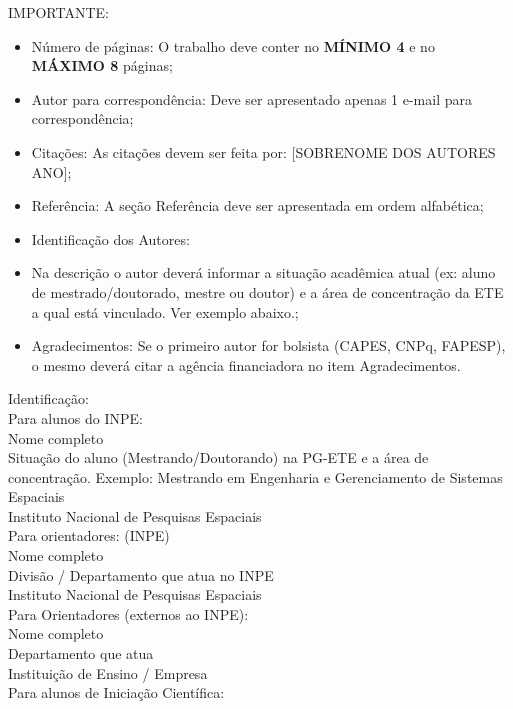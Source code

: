 \documentclass[12pt]{article}
\begin{document}



\textcolor[rgb]{1,0,0}{
	IMPORTANTE:
	\begin{itemize}
		\item Número de páginas: O trabalho deve conter no \textbf{MÍNIMO 4} e no \textbf{MÁXIMO 8} páginas;
		\item Autor para correspondência: Deve ser apresentado apenas 1 e-mail para correspondência;
		\item Citações: As citações devem ser feita por: [SOBRENOME DOS AUTORES ANO];
		\item Referência: A seção Referência deve ser apresentada em ordem alfabética;
		\item Identificação dos Autores:
		\item Na descrição o autor deverá informar a situação acadêmica atual (ex: aluno de mestrado/doutorado, mestre ou doutor) e a área de concentração da ETE a qual está vinculado. Ver exemplo abaixo.;
		\item Agradecimentos: Se o primeiro autor for bolsista (CAPES, CNPq, FAPESP), o mesmo deverá citar a agência financiadora no item Agradecimentos.
	\end{itemize}
	Identificação:\\
	Para alunos do INPE:\\
	Nome completo\\
	Situação do aluno (Mestrando/Doutorando)  na PG-ETE e a área de concentração. Exemplo: Mestrando em Engenharia e Gerenciamento de Sistemas Espaciais\\
	Instituto Nacional de Pesquisas Espaciais\\
	Para orientadores: (INPE)\\
	Nome completo\\
	Divisão / Departamento que atua no INPE\\
	Instituto Nacional de Pesquisas Espaciais\\
	Para Orientadores (externos ao INPE):\\
	Nome completo\\
	Departamento que atua\\
	Instituição de Ensino / Empresa\\
	Para alunos de Iniciação Científica:\\
}
\end{document}
